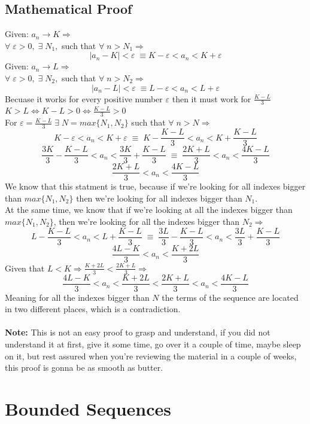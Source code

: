\subsection{Mathematical Proof}
Given: $a_n\rightarrow K \Longrightarrow$\\
$\forall\; \varepsilon>0,\; \exists\; N_1,$ such that $\forall\;n>N_1\Longrightarrow$
\[
    |a_n-K|<\varepsilon\; \equiv K-\varepsilon<a_n<K+\varepsilon
\]
Given: $a_n\rightarrow L \Longrightarrow$\\
$\forall\; \varepsilon>0,\; \exists\; N_2,$ such that $\forall\;n>N_2\Longrightarrow$
\[
    |a_n-L|<\varepsilon\; \equiv L-\varepsilon<a_n<L+\varepsilon
\]
Becuase it works for every positive number $\varepsilon$ then it must work for $\frac{K-L}{3}$\\
$K>L\iff K-L>0\iff \frac{K-L}{3}>0$\\
For $\varepsilon =\frac{K-L}{3}\;\exists\; N=max\{N_1,N_2\}$ such that $\forall\; n>N\Longrightarrow$
\[
    K-\varepsilon<a_n<K+\varepsilon\; \equiv\; K-\frac{K-L}{3}<a_n<K+\frac{K-L}{3}
\]
\[
    \frac{3K}{3}-\frac{K-L}{3}<a_n<\frac{3K}{3}+\frac{K-L}{3}\; \equiv\; \frac{2K+L}{3}<a_n<\frac{4K-L}{3}
\]
\[
    \frac{2K+L}{3}<a_n<\frac{4K-L}{3}
\]
We know that this statment is true, because if we're looking for all indexes bigger than $max\{N_1,N_2\}$ then we're looking for all indexes bigger than $N_1$.\\
At the same time, we know that if we're looking at all the indexes bigger than $max\{N_1,N_2\}$, then we're looking for all the indexes bigger than $N_2\Longrightarrow$
\[
    L-\frac{K-L}{3}<a_n<L+\frac{K-L}{3}\; \equiv\; \frac{3L}{3}-\frac{K-L}{3}<a_n<\frac{3L}{3}+\frac{K-L}{3}
\]
\[
    \frac{4L-K}{3}<a_n<\frac{K+2L}{3}
\]
Given that $L<K \Longrightarrow \frac{K+2L}{3}<\frac{2K+L}{3}\Longrightarrow$
\[
    \frac{4L-K}{3}<a_n<\frac{K+2L}{3}<\frac{2K+L}{3}<a_n<\frac{4K-L}{3}
\]
Meaning for all the indexes bigger than $N$ the terms of the sequence are located in two different places, which is a contradiction.\\\\
\textbf{Note:} This is not an easy proof to grasp and understand, if you did not understand it at first, give it some time, go over it a couple of time, maybe sleep on it, but rest assured when you're reviewing the material in a couple of weeks, this proof is gonna be as smooth as butter.\\


\newpage

\section{Bounded Sequences}
